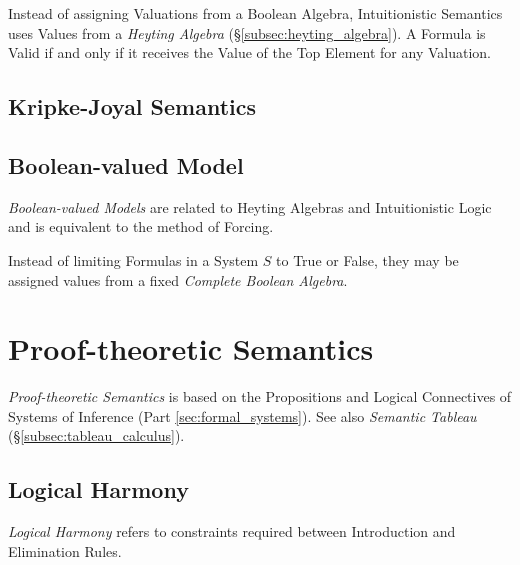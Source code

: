 \documentclass{article}
\begin{document}
Instead of assigning Valuations from a Boolean Algebra, Intuitionistic
Semantics uses Values from a \emph{Heyting Algebra}
(\S\ref{subsec:heyting_algebra}). A Formula is Valid if and only if it
receives the Value of the Top Element for any Valuation.

\subsection{Kripke-Joyal Semantics}

\subsection{Boolean-valued Model}

\emph{Boolean-valued Models} are related to Heyting Algebras and
Intuitionistic Logic and is equivalent to the method of Forcing.

Instead of limiting Formulas in a System $S$ to True or False, they
may be assigned values from a fixed \emph{Complete Boolean Algebra}.

\section{Proof-theoretic Semantics}

\emph{Proof-theoretic Semantics} is based on the Propositions and
Logical Connectives of Systems of Inference (Part
\ref{sec:formal_systems}). See also \emph{Semantic Tableau}
(\S\ref{subsec:tableau_calculus}).

\subsection{Logical Harmony} \label{subsec:logical_harmony}

\emph{Logical Harmony} refers to constraints required between
Introduction and Elimination Rules.
\end{document}
